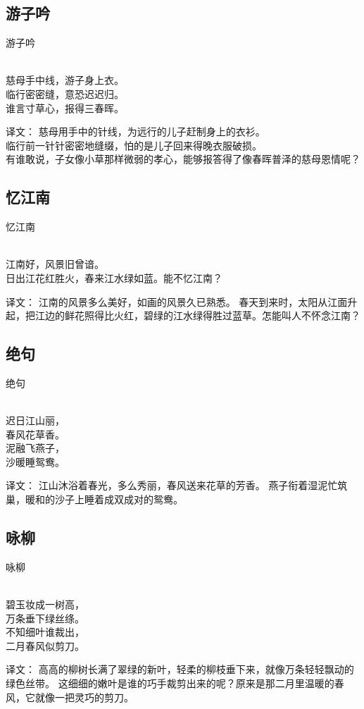\subsection{游子吟}

\noindent 游子吟

  \\

\noindent 慈母手中线，游子身上衣。\\
临行密密缝，意恐迟迟归。\\
谁言寸草心，报得三春晖。

译文：
慈母用手中的针线，为远行的儿子赶制身上的衣衫。\\
临行前一针针密密地缝缀，怕的是儿子回来得晚衣服破损。\\
有谁敢说，子女像小草那样微弱的孝心，能够报答得了像春晖普泽的慈母恩情呢？

\subsection{忆江南}

\noindent 忆江南

  \\

\noindent 江南好，风景旧曾谙。\\
日出江花红胜火，春来江水绿如蓝。能不忆江南？

译文：
江南的风景多么美好，如画的风景久已熟悉。
春天到来时，太阳从江面升起，把江边的鲜花照得比火红，碧绿的江水绿得胜过蓝草。怎能叫人不怀念江南？

\subsection{绝句}

\noindent 绝句

  \\

\noindent 迟日江山丽，\\春风花草香。\\
泥融飞燕子，\\沙暖睡鸳鸯。

译文：
江山沐浴着春光，多么秀丽，春风送来花草的芳香。
燕子衔着湿泥忙筑巢，暖和的沙子上睡着成双成对的鸳鸯。

\subsection{咏柳}

\noindent 咏柳

  \\

\noindent 碧玉妆成一树高，\\万条垂下绿丝绦。\\
不知细叶谁裁出，\\二月春风似剪刀。

译文：
高高的柳树长满了翠绿的新叶，轻柔的柳枝垂下来，就像万条轻轻飘动的绿色丝带。
这细细的嫩叶是谁的巧手裁剪出来的呢？原来是那二月里温暖的春风，它就像一把灵巧的剪刀。